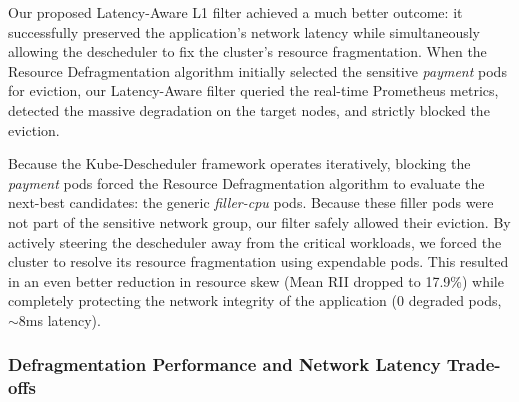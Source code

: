 Our proposed Latency-Aware L1 filter achieved a much better outcome: it successfully preserved the application's network latency while simultaneously allowing the descheduler to fix the cluster's resource fragmentation. When the Resource Defragmentation algorithm initially selected the sensitive \textit{payment} pods for eviction, our Latency-Aware filter queried the real-time Prometheus metrics, detected the massive degradation on the target nodes, and strictly blocked the eviction. 

Because the Kube-Descheduler framework operates iteratively, blocking the \textit{payment} pods forced the Resource Defragmentation algorithm to evaluate the next-best candidates: the generic \textit{filler-cpu} pods. Because these filler pods were not part of the sensitive network group, our filter safely allowed their eviction. By actively steering the descheduler away from the critical workloads, we forced the cluster to resolve its resource fragmentation using expendable pods. This resulted in an even better reduction in resource skew (Mean RII dropped to 17.9\%) while completely protecting the network integrity of the application (0 degraded pods, $\sim$8ms latency). 

\subsubsection{Defragmentation Performance and Network Latency Trade-offs}
\label{subsubsec:netaware4_resultanalysis3_tradeoff}

